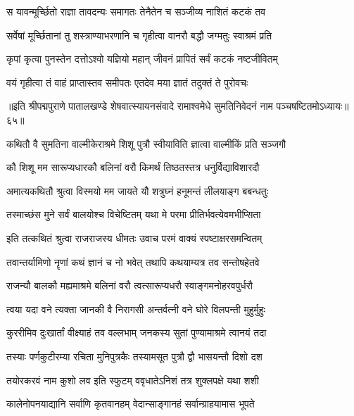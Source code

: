 \twolineshloka
{स यावन्मूर्च्छितो राज्ञा तावदन्यः समागतः}
{तेनैतेन च सञ्जीव्य नाशितं कटकं तव}%

\twolineshloka
{सर्वेषां मूर्च्छितानां तु शस्त्राण्याभरणानि च}
{गृहीत्वा वानरौ बद्धौ जग्मतुः स्वाश्रमं प्रति}%

\twolineshloka
{कृपां कृत्वा पुनस्तेन दत्तोऽश्वो यज्ञियो महान्}
{जीवनं प्रापितं सर्वं कटकं नष्टजीवितम्}%

\twolineshloka
{वयं गृहीत्वा तं वाहं प्राप्तास्तव समीपतः}
{एतदेव मया ज्ञातं तदुक्तं ते पुरोवचः}%

॥इति श्रीपद्मपुराणे पातालखण्डे शेषवात्स्यायनसंवादे रामाश्वमेधे सुमतिनिवेदनं नाम पञ्चषष्टितमोऽध्यायः॥६५॥



\twolineshloka
{कथितौ वै सुमतिना वाल्मीकेराश्रमे शिशू}
{पुत्रौ स्वीयाविति ज्ञात्वा वाल्मीकिं प्रति सञ्जगौ}%


\twolineshloka
{कौ शिशू मम सारूप्यधारकौ बलिनां वरौ}
{किमर्थं तिष्ठतस्तत्र धनुर्विद्याविशारदौ}%

\twolineshloka
{अमात्यकथितौ श्रुत्वा विस्मयो मम जायते}
{यौ शत्रुघ्नं हनूमन्तं लीलयाङ्ग बबन्धतुः}%

\twolineshloka
{तस्माच्छंस मुने सर्वं बालयोश्च विचेष्टितम्}
{यथा मे परमा प्रीतिर्भवत्येवमभीप्सिता}%

\twolineshloka
{इति तत्कथितं श्रुत्वा राजराजस्य धीमतः}
{उवाच परमं वाक्यं स्पष्टाक्षरसमन्वितम्}%


\twolineshloka
{तवान्तर्यामिणो नॄणां कथं ज्ञानं च नो भवेत्}
{तथापि कथयाम्यत्र तव सन्तोषहेतवे}%

\twolineshloka
{राजन्यौ बालकौ मह्यमाश्रमे बलिनां वरौ}
{त्वत्सारूप्यधरौ स्वाङ्गमनोहरवपुर्धरौ}%

\twolineshloka
{त्वया यदा वने त्यक्ता जानकी वै निरागसी}
{अन्तर्वत्नी वने घोरे विलपन्ती मुहुर्मुहुः}%

\twolineshloka
{कुररीमिव दुःखार्तां वीक्ष्याहं तव वल्लभाम्}
{जनकस्य सुतां पुण्यामाश्रमे त्वानयं तदा}%

\twolineshloka
{तस्याः पर्णकुटीरम्या रचिता मुनिपुत्रकैः}
{तस्यामसूत पुत्रौ द्वौ भासयन्तौ दिशो दश}%

\twolineshloka
{तयोरकरवं नाम कुशो लव इति स्फुटम्}
{ववृधातेऽनिशं तत्र शुक्लपक्षे यथा शशी}%

\twolineshloka
{कालेनोपनयाद्यानि सर्वाणि कृतवानहम्}
{वेदान्साङ्गानहं सर्वान्ग्राहयामास भूपते}%

